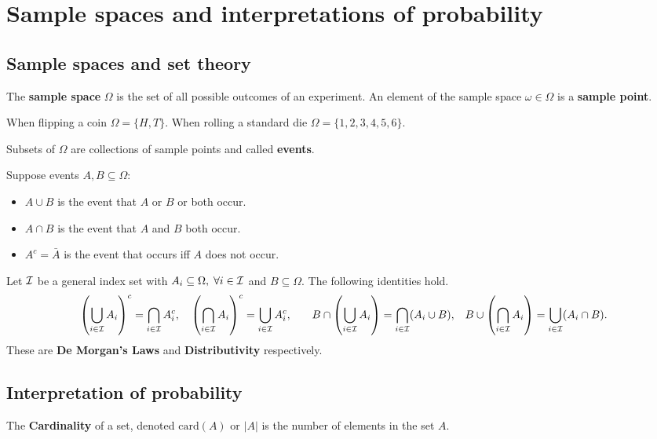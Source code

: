 \section{Sample spaces and interpretations of probability}

\subsection{Sample spaces and set theory}

\begin{definition}
    The \textbf{sample space} $\Omega$ is the set of all possible outcomes of an experiment. An element of the sample space $\omega \in \Omega$ is a \textbf{sample point}.
\end{definition}

\begin{examples}
    When flipping a coin $\Omega  = \{H,T\}$. When rolling a standard die $\Omega = \{1,2,3,4,5,6\}$.
\end{examples}

\begin{definition}
    Subsets of $\Omega$ are collections of sample points and called \textbf{events}.
\end{definition}

Suppose events $A,B\subseteq\Omega$:
\begin{itemize}
    \item $A\cup B$ is the event that $A$ or $B$ or both occur.
    \item $A\cap B$ is the event that $A$ and $B$ both occur.
    \item $A^c = \bar{A}$ is the event that occurs iff $A$ does not occur.
\end{itemize}


Let $\mathcal{I}$ be a general index set with $A_i \subseteq\Omega,\; \forall i \in\mathcal{I}$ and $B \subseteq \Omega$. The following identities hold.
\[
\left( \bigcup_{i\in\mathcal{I}}A_i \right)^c = \bigcap_{i\in\mathcal{I}}A_i^c \textcolor{black}{,} \quad
\left( \bigcap_{i\in\mathcal{I}}A_i \right)^c = \bigcup_{i\in\mathcal{I}}A_i^c \textcolor{black}{,} \qquad
B \cap \left( \bigcup_{i\in\mathcal{I}}A_i \right) = \bigcap_{i\in\mathcal{I}}(A_i\cup B) \textcolor{black}{,} \quad
B \cup \left( \bigcap_{i\in\mathcal{I}}A_i \right) = \bigcup_{i\in\mathcal{I}}(A_i\cap B) \textcolor{black}{.}
\]
These are \textbf{De Morgan's Laws} and \textbf{Distributivity} respectively.


\subsection{Interpretation of probability}
\begin{definition}
    The \textbf{Cardinality} of a set, denoted $\text{card}(A)$ or $|A|$ is the number of elements in the set $A$.
\end{definition}

